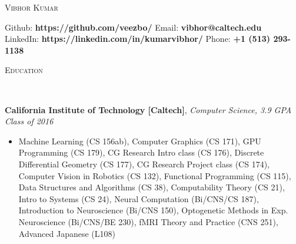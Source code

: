 \documentclass[9pt]{article}
\newenvironment{changemargin}[2]{%
  \begin{list}{}{%
    \setlength{\topsep}{0pt}%
    \setlength{\leftmargin}{#1}%
    \setlength{\rightmargin}{#2}%
    \setlength{\listparindent}{\parindent}%
    \setlength{\itemindent}{\parindent}%
    \setlength{\parsep}{\parskip}%
  }%
  \item[]}{\end{list}
}
\newcommand{\lineover}{
	\begin{changemargin}{-0.05in}{-0.05in}
		\vspace*{-8pt}
		\hrulefill \\
		\vspace*{-2pt}
	\end{changemargin}
}
\newcommand{\header}[1]{
	\begin{changemargin}{-0.5in}{-0.5in}
		\scshape{#1}\\
  	\lineover
	\end{changemargin}
}
\newenvironment{body} {
	\vspace*{-16pt}
	\begin{changemargin}{-0.25in}{-0.5in}
  }	
	{\end{changemargin}
}
\begin{document}
\begin{center} 
	{\Large \scshape Vibhor Kumar} 
\end{center}
	\vspace*{-2pt}
\hspace{-12mm} Github: \hspace{3mm} \textbf{https://github.com/veezbo/}
\hspace{46mm} Email: \hspace{0.1mm} \textbf{vibhor@caltech.edu} \\
\vspace*{1pt}
\hspace{-12mm} LinkedIn: \hspace{0.25mm} \textbf{https://linkedin.com/in/kumarvibhor/} \hspace{26.75mm} Phone: \textbf{+1 (513) 293-1138}\\
\vspace{1pt}
\smallskip
\header{Education}
\begin{body}
	\vspace{16pt}
	\textbf{California Institute of Technology [Caltech]}{}, \emph{Computer Science, 3.9 GPA} \hfill \emph{Class of 2016}{} \\
	\vspace{-3pt}
	\begin{itemize} \itemsep -0pt
	\item Machine Learning (CS 156ab), Computer Graphics (CS 171), GPU Programming (CS 179), CG Research Intro class (CS 176), Discrete Differential Geometry (CS 177), CG Research Project class (CS 174), Computer Vision in Robotics (CS 132), Functional Programming (CS 115), Data Structures and Algorithms (CS 38), Computability Theory (CS 21), Intro to Systems (CS 24), Neural Computation (Bi/CNS/CS 187), Introduction to Neuroscience (Bi/CNS 150), Optogenetic Methods in Exp. Neuroscience (Bi/CNS/BE 230), fMRI Theory and Practice (CNS 251), Advanced Japanese (L108)
	\end{itemize}
\end{body}

\smallskip
\vspace*{-3pt}
\end{document}
